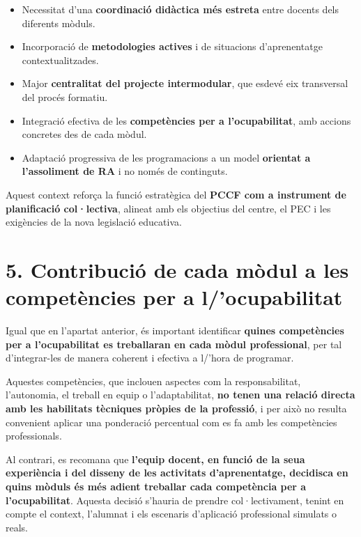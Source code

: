 \documentclass[
  paper=a4,
  ,captions=tableheading
]{scrartcl}
\providecommand{\tightlist}{%
  \setlength{\itemsep}{0pt}\setlength{\parskip}{0pt}}
\begin{document}
\begin{itemize}
\tightlist
\item
  Necessitat d'una \textbf{coordinació didàctica més estreta} entre
  docents dels diferents mòduls.
\item
  Incorporació de \textbf{metodologies actives} i de situacions
  d'aprenentatge contextualitzades.
\item
  Major \textbf{centralitat del projecte intermodular}, que esdevé eix
  transversal del procés formatiu.
\item
  Integració efectiva de les \textbf{competències per a l'ocupabilitat},
  amb accions concretes des de cada mòdul.
\item
  Adaptació progressiva de les programacions a un model \textbf{orientat
  a l'assoliment de RA} i no només de continguts.
\end{itemize}

Aquest context reforça la funció estratègica del \textbf{PCCF com a
instrument de planificació col·lectiva}, alineat amb els objectius del
centre, el PEC i les exigències de la nova legislació educativa.

\hypertarget{contribuciuxf3-de-cada-muxf2dul-a-les-competuxe8ncies-per-a-locupabilitat}{%
\section{5. Contribució de cada mòdul a les competències per a
l/'ocupabilitat}\label{contribuciuxf3-de-cada-muxf2dul-a-les-competuxe8ncies-per-a-locupabilitat}}

Igual que en l'apartat anterior, és important identificar \textbf{quines
competències per a l'ocupabilitat es treballaran en cada mòdul
professional}, per tal d'integrar-les de manera coherent i efectiva a
l/'hora de programar.

Aquestes competències, que inclouen aspectes com la responsabilitat,
l'autonomia, el treball en equip o l'adaptabilitat, \textbf{no tenen una
relació directa amb les habilitats tècniques pròpies de la professió}, i
per això no resulta convenient aplicar una ponderació percentual com es
fa amb les competències professionals.

Al contrari, es recomana que \textbf{l'equip docent, en funció de la
seua experiència i del disseny de les activitats d'aprenentatge,
decidisca en quins mòduls és més adient treballar cada competència per a
l'ocupabilitat}. Aquesta decisió s'hauria de prendre col·lectivament,
tenint en compte el context, l'alumnat i els escenaris d'aplicació
professional simulats o reals.
\end{document}
